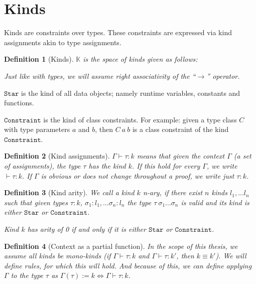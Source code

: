 \documentclass[12pt,a4paper]{article}
\newtheorem{definition}{Definition}
\begin{document}
\section{Kinds}

Kinds are constraints over types. These constraints are expressed via kind assignments akin to type assignments.

\begin{definition}[Kinds]
    $\mathbb{K}$ is the space of kinds given as follows:
    \begin{algorithmic}
    \end{algorithmic}
    Just like with types, we will assume right associativity of the ``$\to$'' operator.
\end{definition}

$\mathtt{Star}$ is the kind of all data objects; namely runtime variables, constants and functions.

$\mathtt{Constraint}$ is the kind of class constraints. For example: given a type class $C$ with type parameters $a$ and $b$, then $C\ a\ b$ is a class constraint of the kind $\mathtt{Constraint}$.

\begin{definition}[Kind assignments]
    $\Gamma \vdash \tau : k$ means that given the context $\Gamma$ (a set of assignments), the type $\tau$ has the kind $k$. If this hold for every $\Gamma$, we write $\vdash \tau : k$. If $\Gamma$ is obvious or does not change throughout a proof, we write just $\tau : k$.
\end{definition}

\begin{definition}[Kind arity]
    We call a kind $k$ n-ary, if there exist $n$ kinds $l_1, \dots l_n$ such that given types $\tau : k$, $\sigma_1 : l_1, \dots \sigma_{n} : l_{n}$ the type $\tau\ \sigma_1 \dots \sigma_n$ is valid and its kind is either $\mathtt{Star}$ or $\mathtt{Constraint}$.
    
    Kind $k$ has arity of 0 if and only if it is either $\mathtt{Star}$ or $\mathtt{Constraint}$.
\end{definition}

\begin{definition}[Context as a partial function]
    In the scope of this thesis, we assume all kinds be mono-kinds (if $\Gamma \vdash \tau : k$ and $\Gamma \vdash \tau : k'$, then $k \equiv k'$). We will define rules, for which this will hold. And because of this, we can define applying $\Gamma$ to the type $\tau$ as $\Gamma(\tau) := k \Leftrightarrow \Gamma \vdash \tau : k$.
\end{definition}
\end{document}

